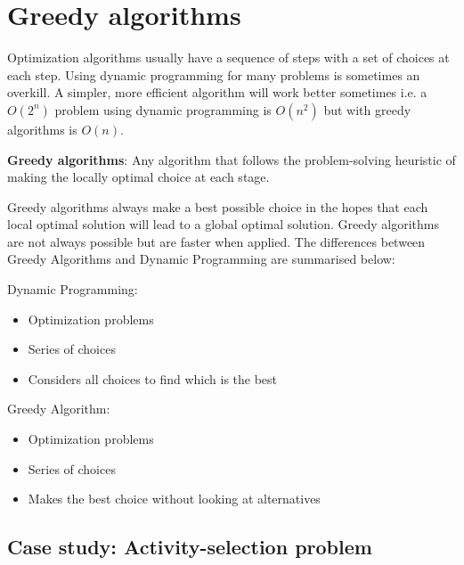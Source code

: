 \documentclass[10pt,a4paper]{article}
\begin{document}
\pagebreak

\section{Greedy algorithms}

Optimization algorithms usually have a sequence of steps with a set of choices at each step. Using
dynamic programming for many problems is sometimes an overkill. A simpler, more efficient algorithm
will work better sometimes i.e. a $O(2^n)$ problem using dynamic programming is $O(n^2)$ but with
greedy algorithms is $O(n)$. \par 

\begin{tcolorbox}[breakable,colback=white]
\textbf{Greedy algorithms}: Any algorithm that follows the problem-solving heuristic of making the locally optimal choice at each stage.
\end{tcolorbox}

Greedy algorithms always make a best possible choice in the hopes that each local optimal solution will
lead to a global optimal solution. Greedy algorithms are not always possible but are faster when
applied. The differences between Greedy Algorithms and Dynamic Programming are summarised below:
\begin{multicols}{2}
    Dynamic Programming:
    \begin{itemize}
        \item Optimization problems
        \item Series of choices
        \item Considers all choices to find which is the best
    \end{itemize}
    
    Greedy Algorithm:
    \begin{itemize}
        \item Optimization problems
        \item Series of choices
        \item Makes the best choice without looking at alternatives
    \end{itemize}
\end{multicols}

\subsection{Case study: Activity-selection problem}
\end{document}
